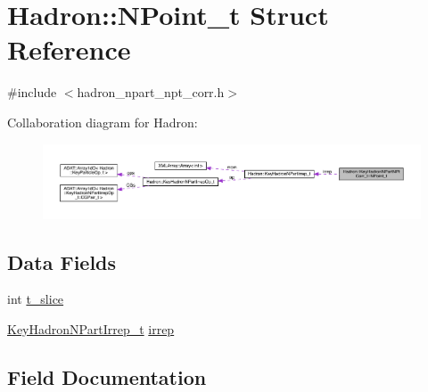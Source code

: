 \hypertarget{structHadron_1_1KeyHadronNPartNPtCorr__t_1_1NPoint__t}{}\section{Hadron\+:\+:N\+Point\+\_\+t Struct Reference}
\label{structHadron_1_1KeyHadronNPartNPtCorr__t_1_1NPoint__t}


{\ttfamily \#include $<$hadron\+\_\+npart\+\_\+npt\+\_\+corr.\+h$>$}



Collaboration diagram for Hadron\+:\nopagebreak
\begin{figure}[H]
\begin{center}
\leavevmode
\includegraphics[width=350pt]{da/da0/structHadron_1_1KeyHadronNPartNPtCorr__t_1_1NPoint__t__coll__graph}
\end{center}
\end{figure}
\subsection*{Data Fields}
\begin{DoxyCompactItemize}
\item 
int \mbox{\hyperlink{structHadron_1_1KeyHadronNPartNPtCorr__t_1_1NPoint__t_a9deb6b9a180b16925cccb4c08b1b8fdd}{t\+\_\+slice}}
\item 
\mbox{\hyperlink{structHadron_1_1KeyHadronNPartIrrep__t}{Key\+Hadron\+N\+Part\+Irrep\+\_\+t}} \mbox{\hyperlink{structHadron_1_1KeyHadronNPartNPtCorr__t_1_1NPoint__t_a94ba38e91423b2c27a993148d515f386}{irrep}}
\end{DoxyCompactItemize}


\subsection{Field Documentation}
\mbox{\label{structHadron_1_1KeyHadronNPartNPtCorr__t_1_1NPoint__t_a94ba38e91423b2c27a993148d515f386}} 
